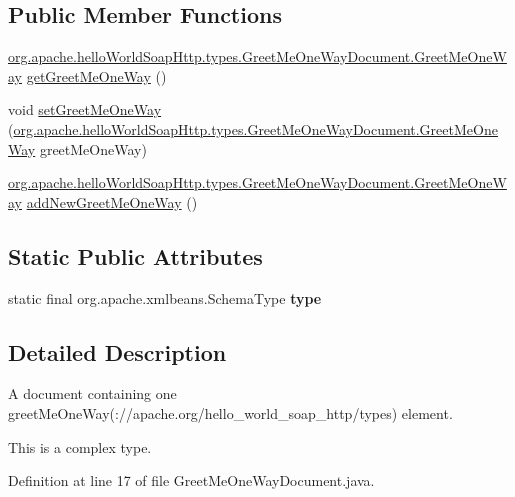 \subsection*{Public Member Functions}
\begin{DoxyCompactItemize}
\item 
\hyperlink{interfaceorg_1_1apache_1_1hello_world_soap_http_1_1types_1_1_greet_me_one_way_document_1_1_greet_me_one_way}{org.\+apache.\+hello\+World\+Soap\+Http.\+types.\+Greet\+Me\+One\+Way\+Document.\+Greet\+Me\+One\+Way} \hyperlink{interfaceorg_1_1apache_1_1hello_world_soap_http_1_1types_1_1_greet_me_one_way_document_afbc3009aff54239eb0e7540dfeb7ed20}{get\+Greet\+Me\+One\+Way} ()
\item 
void \hyperlink{interfaceorg_1_1apache_1_1hello_world_soap_http_1_1types_1_1_greet_me_one_way_document_a801e4453fd641fcbfcb1e7e6937dcd19}{set\+Greet\+Me\+One\+Way} (\hyperlink{interfaceorg_1_1apache_1_1hello_world_soap_http_1_1types_1_1_greet_me_one_way_document_1_1_greet_me_one_way}{org.\+apache.\+hello\+World\+Soap\+Http.\+types.\+Greet\+Me\+One\+Way\+Document.\+Greet\+Me\+One\+Way} greet\+Me\+One\+Way)
\item 
\hyperlink{interfaceorg_1_1apache_1_1hello_world_soap_http_1_1types_1_1_greet_me_one_way_document_1_1_greet_me_one_way}{org.\+apache.\+hello\+World\+Soap\+Http.\+types.\+Greet\+Me\+One\+Way\+Document.\+Greet\+Me\+One\+Way} \hyperlink{interfaceorg_1_1apache_1_1hello_world_soap_http_1_1types_1_1_greet_me_one_way_document_a7d197ae2daff07105ba4f5ea8de0333e}{add\+New\+Greet\+Me\+One\+Way} ()
\end{DoxyCompactItemize}
\subsection*{Static Public Attributes}
\begin{DoxyCompactItemize}
\item 
static final org.\+apache.\+xmlbeans.\+Schema\+Type {\bfseries type}
\end{DoxyCompactItemize}


\subsection{Detailed Description}
A document containing one greet\+Me\+One\+Way(\+://apache.org/hello\+\_\+world\+\_\+soap\+\_\+http/types) element.

This is a complex type. 

Definition at line 17 of file Greet\+Me\+One\+Way\+Document.\+java.



